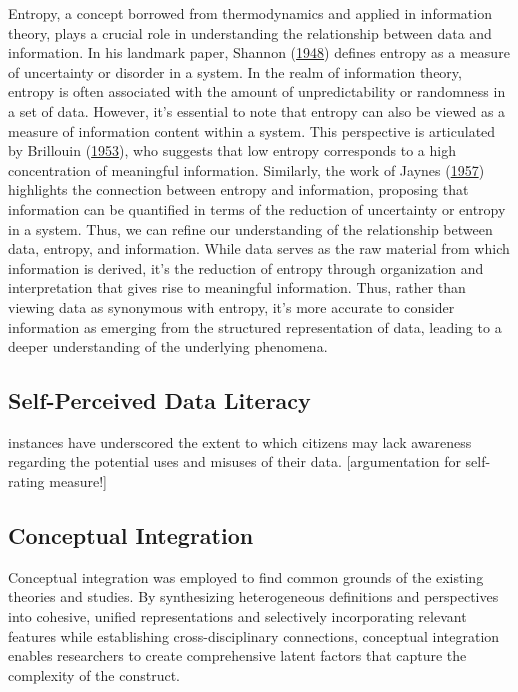 \documentclass[
  12pt,
  a4paper,
  twoside]{article}
\begin{document}
Entropy, a concept borrowed from thermodynamics and applied in information theory, plays a crucial role in understanding the relationship between data and information. In his landmark paper, Shannon (\protect\hyperlink{ref-shannon1948}{1948}) defines entropy as a measure of uncertainty or disorder in a system. In the realm of information theory, entropy is often associated with the amount of unpredictability or randomness in a set of data.
However, it's essential to note that entropy can also be viewed as a measure of information content within a system. This perspective is articulated by Brillouin (\protect\hyperlink{ref-brillouin1953}{1953}), who suggests that low entropy corresponds to a high concentration of meaningful information. Similarly, the work of Jaynes (\protect\hyperlink{ref-jaynes1957}{1957}) highlights the connection between entropy and information, proposing that information can be quantified in terms of the reduction of uncertainty or entropy in a system.
Thus, we can refine our understanding of the relationship between data, entropy, and information. While data serves as the raw material from which information is derived, it's the reduction of entropy through organization and interpretation that gives rise to meaningful information. Thus, rather than viewing data as synonymous with entropy, it's more accurate to consider information as emerging from the structured representation of data, leading to a deeper understanding of the underlying phenomena.

\hypertarget{self-perceived-data-literacy}{%
\subsection{Self-Perceived Data Literacy}\label{self-perceived-data-literacy}}

instances have underscored the extent to which citizens may lack awareness regarding the potential uses and misuses of their data. {[}argumentation for self-rating measure!{]}

\hypertarget{conceptual-integration}{%
\subsection{Conceptual Integration}\label{conceptual-integration}}

Conceptual integration was employed to find common grounds of the existing theories and studies.
By synthesizing heterogeneous definitions and perspectives into cohesive, unified representations and selectively incorporating relevant features while establishing cross-disciplinary connections, conceptual integration enables researchers to create comprehensive latent factors that capture the complexity of the construct.
\end{document}
